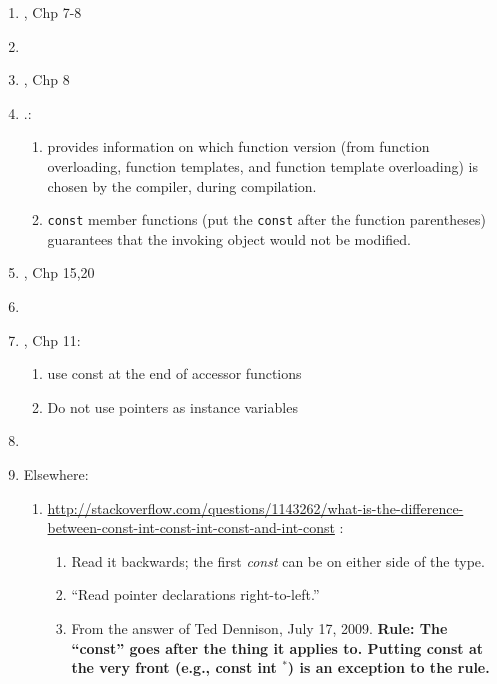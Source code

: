 \begin{enumerate}
\begin{enumerate}
	\item \cite{Prata2012}, Chp 7-8
	\item \cite[Chp. 4--5; \S11.1; and Chp. 14]{Savitch2009}
	\item \cite{Stroustrup2009}, Chp 8
	\item \cite[Chp. 7--8, pp. 279--391]{Prata2005}.: \vspace{-0.2cm}
		\begin{enumerate} \itemsep -2pt
		\item \cite[pp. 382--383]{Prata2005} provides information on which function version (from function overloading, function templates, and function template overloading) is chosen by the compiler, during compilation.
		\item {\tt const} member functions (put the {\tt const} after the function parentheses) guarantees that the invoking object would not be modified.
		\end{enumerate}
	\item \cite{Oualline2003}, Chp 15,20
	\item \cite[Chp. 6--8, pp. 105--179]{Schildt2003a}
	\item \cite{Eckel2000}, Chp 11: \vspace{-0.2cm}
		\begin{enumerate} \itemsep -2pt
		\item use const at the end of accessor functions
		\item Do not use pointers as instance variables
		\end{enumerate}
	\item \cite[Chp. 5--6; pp. 113--160]{Schildt1998a}
	\item Elsewhere: \vspace{-0.2cm}
		\begin{enumerate} \itemsep -2pt
		\item \url{http://stackoverflow.com/questions/1143262/what-is-the-difference-between-const-int-const-int-const-and-int-const} \cite{Mortensen2015}: \vspace{-0.1cm}
			\begin{enumerate} \itemsep -1pt
			\item Read it backwards; the first {\it const} can be on either side of the type.
			\item ``Read pointer declarations right-to-left.''
			\item From the answer of Ted Dennison, July 17, 2009. {\bf Rule: The ``const'' goes after the thing it applies to. Putting const at the very front (e.g., const int $^{\ast}$) is an exception to the rule.}

\end{enumerate}
\end{enumerate}
\end{enumerate}
\end{enumerate}

